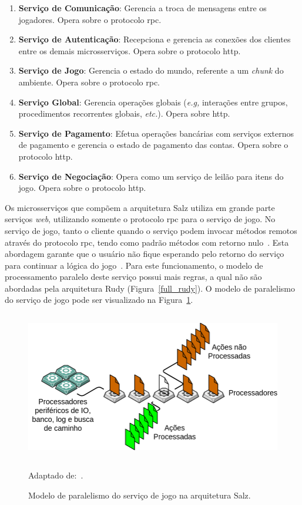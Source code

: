 \begin{enumerate}
  \item \textbf{Serviço de Comunicação}: Gerencia a troca de mensagens entre os jogadores. Opera sobre o protocolo \ac{rpc}.
  \item \textbf{Serviço de Autenticação}: Recepciona e gerencia as conexões dos clientes entre os demais microsserviços. Opera sobre o protocolo \ac{http}.
  \item \textbf{Serviço de Jogo}: Gerencia o estado do mundo, referente a um \textit{chunk} do ambiente. Opera sobre o protocolo \ac{rpc}.
  \item \textbf{Serviço Global}: Gerencia operações globais (\textit{e.g,} interações entre grupos, procedimentos recorrentes globais, \textit{etc.}). Opera sobre \ac{http}.
  \item \textbf{Serviço de Pagamento}: Efetua operações bancárias com serviços externos de pagamento e gerencia o estado de pagamento das contas. Opera sobre o protocolo \ac{http}.
  \item \textbf{Serviço de Negociação}: Opera como um serviço de leilão para itens do jogo. Opera sobre o protocolo \ac{http}.
\end{enumerate}



Os microsserviços que compõem a arquitetura Salz utiliza em grande parte serviços \textit{web}, utilizando somente o protocolo \ac{rpc} para o serviço de jogo.
%
No serviço de jogo, tanto o cliente quando o serviço podem invocar métodos remotos através do protocolo \ac{rpc}, tendo como padrão métodos com retorno nulo~\cite{salz_albion, photon_serialization}.
%
Esta abordagem garante que o usuário não fique esperando pelo retorno do serviço para continuar a lógica do jogo~\cite{faber}.
%
Para este funcionamento, o modelo de processamento paralelo deste serviço possui mais regras, a qual não são abordadas pela arquitetura Rudy (Figura~\ref{full_rudy}).
%
O modelo de paralelismo do serviço de jogo pode ser visualizado na Figura~\ref{salz_thread_model}.


\begin{figure}[htb!]
  \caption{Modelo de paralelismo do serviço de jogo na arquitetura Salz.}
  \label{salz_thread_model}
  \includegraphics[height=6.5cm]{arquiteturas/salz_thread_model.png}
  \centering

  Adaptado de:~\cite{salz_albion, willson}.
\end{figure}



